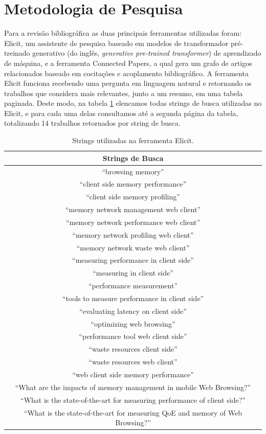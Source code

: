 \documentclass[12pt]{tcc}
\begin{document}
	\section{Metodologia de Pesquisa}

	Para a revisão bibliográfica as duas principais ferramentas utilizadas foram: Elicit, um assistente de pesquisa baseado em modelos de transformador pré-treinado generativo (do inglês, \emph{generative pre-trained transformer}) de aprendizado de máquina, e a ferramenta Connected Papers, a qual  gera um grafo de artigos relacionados baseado em cocitações e acoplamento bibliográfico.
	A ferramenta Elicit funciona recebendo uma pergunta em linguagem natural e retornando os trabalhos que considera mais relevantes, junto a um resumo, em uma tabela paginada.
	Deste modo, na tabela \ref{tab:strings-elicit} elencamos todas strings de busca utilizadas no Elicit, e para cada uma delas consultamos até a segunda página da tabela, totalizando 14 trabalhos retornados por string de busca.

	\begin{table}[h!]
	\centering
	\caption{Strings utilizadas na ferramenta Elicit.\label{long}}

	\begin{tabular}{||c||} 
		
	\hline
		Strings de Busca \\
	\hline\hline
	``browsing memory'' \\
	``client side memory performance'' \\
	``client side memory profiling'' \\
	``memory network management web client'' \\
	``memory network performance web client'' \\
	``memory network profiling web client'' \\
	``memory network waste web client'' \\
	``measuring performance in client side'' \\
	``measuring in client side'' \\
	``performance measurement'' \\
	``tools to measure performance in client side'' \\
	``evaluating latency on client side'' \\
	``optimizing web browsing'' \\
	``performance tool web client side'' \\
	``waste resources client side'' \\
	``waste resources web client'' \\
	``web client side memory performance'' \\
	``What are the impacts of memory management in mobile Web Browsing?'' \\
	``What is the state-of-the-art for measuring performance of client side?'' \\
	``What is the state-of-the-art for measuring QoE and memory of Web Browsing?'' \\

	\hline
	\end{tabular}
	\label{tab:strings-elicit}
	\end{table}
\end{document}
